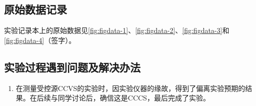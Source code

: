 \documentclass[dvipsnames, svgnames,a4paper,11pt]{article}
\begin{document}
	\clearpage
	\subsection{原始数据记录}
	实验记录本上的原始数据见\cref{fig:figdata-1}、\cref{fig:figdata-2}、\cref{fig:figdata-3}和\cref{fig:figdata-4}（签字）。
	
	\begin{figure}[htbp]
		\centering
		\quad
		\quad
		\quad
		\quad
		\label{fig:graph10}
	\end{figure}


	
	
	
	
	
	
	\subsection{实验过程遇到问题及解决办法}
	\begin{enumerate}
		\item 在测量受控源CCVS的实验时，因实验仪器的缘故，得到了偏离实验预期的结果。在后续与同学讨论后，确信这是CCCS，最后完成了实验。
	\end{enumerate}
	
\end{document}
